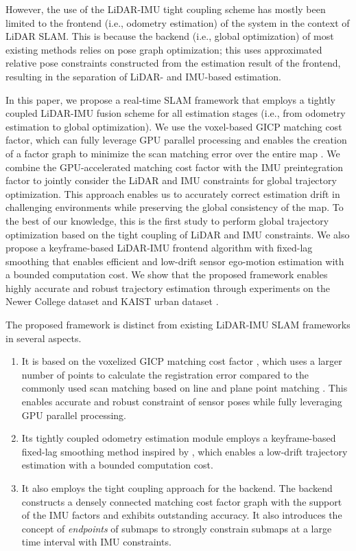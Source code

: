 \documentclass[letterpaper, 10 pt, conference]{ieeeconf}  %
\begin{document}

However, the use of the LiDAR-IMU tight coupling scheme has mostly been limited to the frontend (i.e., odometry estimation) of the system in the context of LiDAR SLAM. This is because the backend (i.e., global optimization) of most existing methods relies on pose graph optimization; this uses approximated relative pose constraints constructed from the estimation result of the frontend, resulting in the separation of LiDAR- and IMU-based estimation.

In this paper, we propose a real-time SLAM framework that employs a tightly coupled LiDAR-IMU fusion scheme for all estimation stages (i.e., from odometry estimation to global optimization). We use the voxel-based GICP matching cost factor, which can fully leverage GPU parallel processing and enables the creation of a factor graph to minimize the scan matching error over the entire map \cite{koide_ral2021}. We combine the GPU-accelerated matching cost factor with the IMU preintegration factor to jointly consider the LiDAR and IMU constraints for global trajectory optimization. This approach enables us to accurately correct estimation drift in challenging environments while preserving the global consistency of the map. To the best of our knowledge, this is the first study to perform global trajectory optimization based on the tight coupling of LiDAR and IMU constraints. We also propose a keyframe-based LiDAR-IMU frontend algorithm with fixed-lag smoothing that enables efficient and low-drift sensor ego-motion estimation with a bounded computation cost. We show that the proposed framework enables highly accurate and robust trajectory estimation through experiments on the Newer College dataset \cite{Ramezani2020} and KAIST urban dataset \cite{Jeong2018}. 

The proposed framework is distinct from existing LiDAR-IMU SLAM frameworks in several aspects.
\begin{enumerate}
  \item It is based on the voxelized GICP matching cost factor \cite{koide_ral2021}, which uses a larger number of points to calculate the registration error compared to the commonly used scan matching based on line and plane point matching \cite{Ye2019}. This enables accurate and robust constraint of sensor poses while fully leveraging GPU parallel processing.
  \item Its tightly coupled odometry estimation module employs a keyframe-based fixed-lag smoothing method inspired by \cite{Engel2018}, which enables a low-drift trajectory estimation with a bounded computation cost.
  \item It also employs the tight coupling approach for the backend. The backend constructs a densely connected matching cost factor graph with the support of the IMU factors and exhibits outstanding accuracy. It also introduces the concept of {\it endpoints} of submaps to strongly constrain submaps at a large time interval with IMU constraints.
\end{enumerate}
\end{document}
